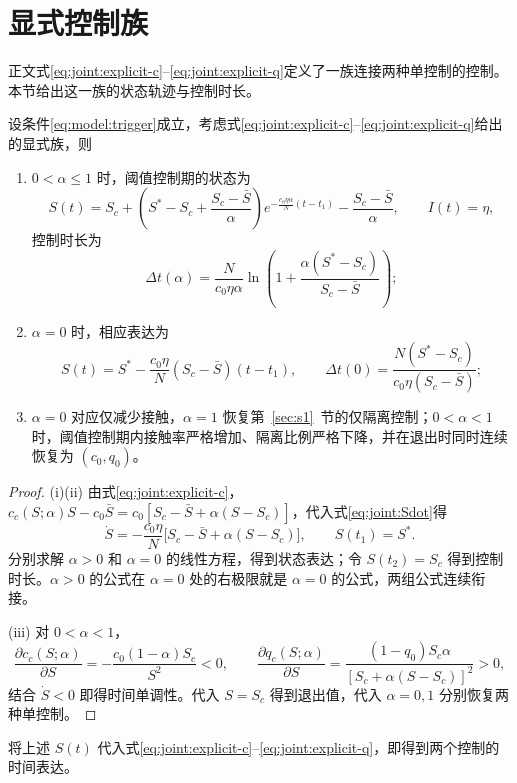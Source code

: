 \section{显式控制族}
\label{sec:sup:explicit}
正文式\eqref{eq:joint:explicit-c}--\eqref{eq:joint:explicit-q}定义了一族连接两种单控制的控制。本节给出这一族的状态轨迹与控制时长。
\begin{theorem}
\label{thm:joint:explicit}
设条件\eqref{eq:model:trigger}成立，考虑式\eqref{eq:joint:explicit-c}--\eqref{eq:joint:explicit-q}给出的显式族，则
\begin{enumerate}
\renewcommand{\labelenumi}{(\roman{enumi})}
\item $0<\alpha\le1$ 时，阈值控制期的状态为
\begin{equation}
S(t)=S_c+
\left(S^*-S_c+\frac{S_c-\bar S}{\alpha}\right)
 e^{-\frac{c_0\eta\alpha}{N}(t-t_1)}
-\frac{S_c-\bar S}{\alpha},\qquad I(t)=\eta,
\label{eq:joint:explicit-S}
\end{equation}
控制时长为
\begin{equation}
\Delta t(\alpha)=\frac{N}{c_0\eta\alpha}
\ln\!\left(1+\frac{\alpha(S^*-S_c)}{S_c-\bar S}\right);
\label{eq:joint:explicit-duration}
\end{equation}
\item $\alpha=0$ 时，相应表达为
\begin{equation}
S(t)=S^*-\frac{c_0\eta}{N}(S_c-\bar S)(t-t_1),\qquad
\Delta t(0)=\frac{N(S^*-S_c)}{c_0\eta(S_c-\bar S)};
\label{eq:joint:explicit-zero}
\end{equation}
\item $\alpha=0$ 对应仅减少接触，$\alpha=1$ 恢复第~\ref{sec:s1}~节的仅隔离控制；$0<\alpha<1$ 时，阈值控制期内接触率严格增加、隔离比例严格下降，并在退出时同时连续恢复为 $(c_0,q_0)$。
\end{enumerate}
\end{theorem}
\begin{proof}
(i)(ii) 由式\eqref{eq:joint:explicit-c}，$c_c(S;\alpha)S-c_0\bar S=c_0[S_c-\bar S+\alpha(S-S_c)]$，代入式\eqref{eq:joint:Sdot}得
\[
\dot S=-\frac{c_0\eta}{N}\bigl[S_c-\bar S+\alpha(S-S_c)\bigr],
\qquad S(t_1)=S^*.
\]
分别求解 $\alpha>0$ 和 $\alpha=0$ 的线性方程，得到状态表达；令 $S(t_2)=S_c$ 得到控制时长。$\alpha>0$ 的公式在 $\alpha=0$ 处的右极限就是 $\alpha=0$ 的公式，两组公式连续衔接。

(iii) 对 $0<\alpha<1$，
\[
\frac{\partial c_c(S;\alpha)}{\partial S}
=-\frac{c_0(1-\alpha)S_c}{S^2}<0,\qquad
\frac{\partial q_c(S;\alpha)}{\partial S}
=\frac{(1-q_0)S_c\alpha}{[S_c+\alpha(S-S_c)]^2}>0,
\]
结合 $\dot S<0$ 即得时间单调性。代入 $S=S_c$ 得到退出值，代入 $\alpha=0,1$ 分别恢复两种单控制。
\end{proof}
将上述 $S(t)$ 代入式\eqref{eq:joint:explicit-c}--\eqref{eq:joint:explicit-q}，即得到两个控制的时间表达。

